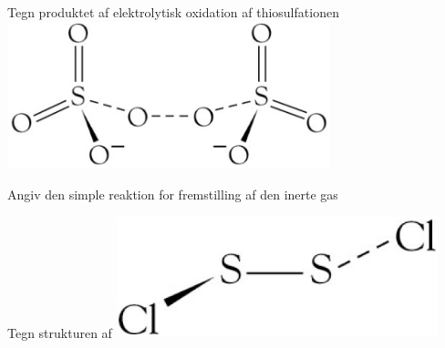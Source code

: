 \begin{flashcard}[Struktur]{Tegn produktet af elektrolytisk oxidation af thiosulfationen}
\includegraphics[width=0.7\textwidth]{figures/k16s443Peroxodisulfat.png}
\end{flashcard}

\begin{flashcard}[Fremstilling]{Angiv den simple reaktion for fremstilling af den inerte gas }
\end{flashcard}

\begin{flashcard}[Struktur]{Tegn strukturen af }
\includegraphics[width=0.7\textwidth]{figures/k16s444S2Cl2.png}
\end{flashcard}